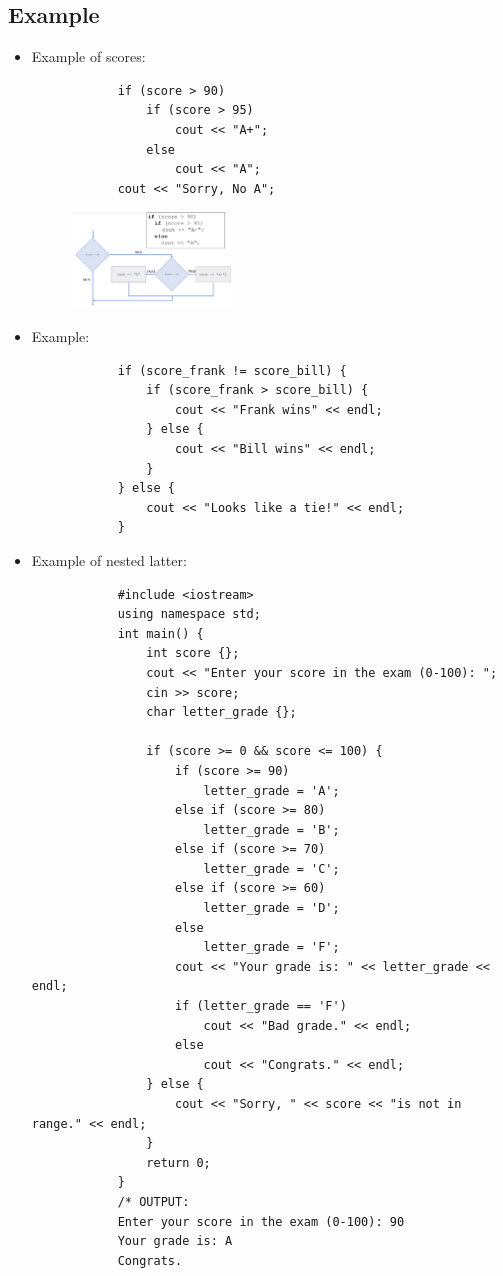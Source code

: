 \subsection{Example}
\begin{itemize}
    \item Example of scores:
        \begin{verbatim}
            if (score > 90) 
                if (score > 95)
                    cout << "A+";
                else 
                    cout << "A";
            cout << "Sorry, No A";
        \end{verbatim}
        \begin{figure}[H]
            \centering
            \includegraphics[width=0.4\textwidth]{./figs/exnestedif.png}
        \end{figure}
    
    \item Example:
        \begin{verbatim}
            if (score_frank != score_bill) {
                if (score_frank > score_bill) {
                    cout << "Frank wins" << endl;
                } else {
                    cout << "Bill wins" << endl;
                }
            } else {
                cout << "Looks like a tie!" << endl;
            }
        \end{verbatim}
    
    \item Example of nested latter:
        \begin{verbatim}
            #include <iostream>
            using namespace std;
            int main() {
                int score {};
                cout << "Enter your score in the exam (0-100): ";
                cin >> score;
                char letter_grade {};

                if (score >= 0 && score <= 100) {
                    if (score >= 90)
                        letter_grade = 'A';
                    else if (score >= 80)
                        letter_grade = 'B';
                    else if (score >= 70)
                        letter_grade = 'C';
                    else if (score >= 60)
                        letter_grade = 'D';
                    else
                        letter_grade = 'F';
                    cout << "Your grade is: " << letter_grade << endl;
                    if (letter_grade == 'F') 
                        cout << "Bad grade." << endl;
                    else 
                        cout << "Congrats." << endl;
                } else {
                    cout << "Sorry, " << score << "is not in range." << endl;
                }
                return 0;
            }
            /* OUTPUT:
            Enter your score in the exam (0-100): 90
            Your grade is: A
            Congrats.


\end{verbatim}
\end{itemize}
